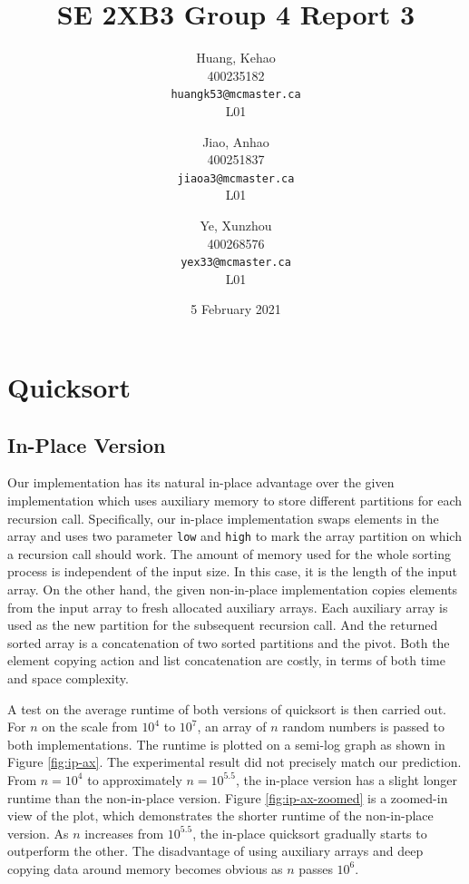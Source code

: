 \documentclass[titlepage, 12pt]{article}
\title{SE 2XB3 Group 4 Report 3}
\author{
  Huang, Kehao \\
  400235182 \\
  \texttt{huangk53@mcmaster.ca} \\
  L01
  \and
  Jiao, Anhao \\
  400251837 \\
  \texttt{jiaoa3@mcmaster.ca} \\
  L01
  \and
  Ye, Xunzhou \\
  400268576 \\
  \texttt{yex33@mcmaster.ca} \\
  L01
}
\date{5 February 2021}
\begin{document}
\maketitle{}

\newpage{}

\section{Quicksort}

\subsection{In-Place Version}

Our implementation has its natural in-place advantage over the given
implementation which uses auxiliary memory to store different partitions for
each recursion call. Specifically, our in-place implementation swaps elements in
the array and uses two parameter \texttt{low} and \texttt{high} to mark the
array partition on which a recursion call should work. The amount of memory used
for the whole sorting process is independent of the input size. In this case, it
is the length of the input array. On the other hand, the given non-in-place
implementation copies elements from the input array to fresh allocated auxiliary
arrays. Each auxiliary array is used as the new partition for the subsequent
recursion call. And the returned sorted array is a concatenation of two sorted
partitions and the pivot. Both the element copying action and list concatenation
are costly, in terms of both time and space complexity.

A test on the average runtime of both versions of quicksort is then carried out.
For \( n \) on the scale from \( 10^4 \) to \( 10^7 \), an array of \( n \)
random numbers is passed to both implementations. The runtime is plotted on a
semi-log graph as shown in Figure \ref{fig:ip-ax}. The experimental result did
not precisely match our prediction. From \( n = 10^4 \) to approximately \( n =
10^{5.5} \), the in-place version has a slight longer runtime than the
non-in-place version. Figure \ref{fig:ip-ax-zoomed} is a zoomed-in view of the
plot, which demonstrates the shorter runtime of the non-in-place version. As \(
n \) increases from \( 10^{5.5} \), the in-place quicksort gradually starts to
outperform the other. The disadvantage of using auxiliary arrays and deep
copying data around memory becomes obvious as \( n \) passes \( 10^6 \).
\end{document}
